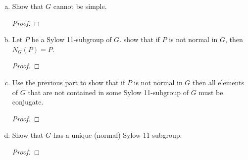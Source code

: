 \begin{itemize}
\begin{enumerate}[(a)]
\begin{proof}
\end{proof}

\item Show that $G$ cannot be simple.
\begin{proof}

\end{proof}

\item Let $P$ be a Sylow 11-subgroup of $G$. show that if $P$ is not normal in $G$, then $N_G (P) = P$.
\begin{proof}

\end{proof}

\item Use the previous part to show that if $P$ is not normal in $G$ then all elements of $G$ that are not contained in some Sylow 11-subgroup of $G$ must be conjugate.
\begin{proof}

\end{proof}

\item Show that $G$ has a unique (normal) Sylow 11-subgroup.
\begin{proof}

\end{proof}
\end{enumerate}












\end{itemize}